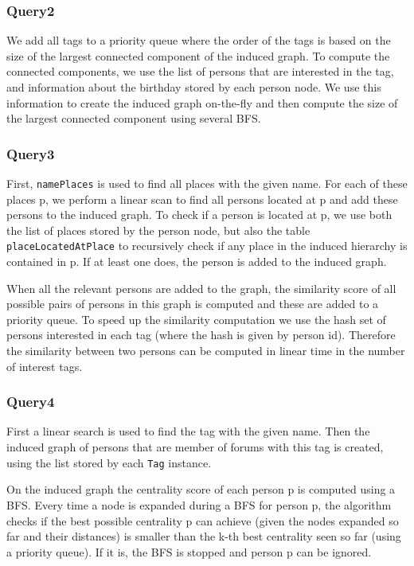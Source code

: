\documentclass{article}
\begin{document}
\subsubsection{Query2}
We add all tags to a priority queue where the order of
the tags is based on the size of the largest connected component of
the induced graph. To compute the connected components, we use the list of persons 
that are interested in the tag, and information about the birthday stored 
by each person node. We use this information to create the induced graph on-the-fly 
and then compute the size of the largest connected component using several BFS.
              
\subsubsection{Query3} 
First, \texttt{namePlaces} is used to find all places with
the given name. For each of these places p, we perform a linear scan to find 
all persons located at p and add these persons to the induced graph. 
To check if a person is located at p, we use both the 
list of places stored by the person node, but also the table 
\texttt{placeLocatedAtPlace} to recursively check if any place 
in the induced hierarchy is contained in p. If at least one does, 
the person is added to the induced graph.
              
When all the relevant persons are added to the graph, 
the similarity score of all possible pairs of persons in this
graph is computed and these are added to a priority queue. To speed up
the similarity computation we use the hash set of persons interested in
each tag (where the hash is given by person id). Therefore the similarity 
between two persons can be computed in linear time in the number of 
interest tags.
              
\subsubsection{Query4} First a linear search is used to find the tag with
the given name. Then the induced graph of persons that are member of
forums with this tag is created, using the list stored by each \texttt{Tag} instance.
               
On the induced graph the centrality score of each person p is computed
using a BFS. Every time a node is expanded during a BFS for person p, the
algorithm checks if the best possible centrality p can
achieve (given the nodes expanded so far and their distances) 
is smaller than the k-th best centrality seen so far (using a priority queue). 
If it is, the BFS is stopped and person p can be ignored. 
\end{document}
